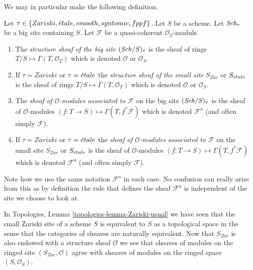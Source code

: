 \noindent
We may in particular make the following definition.

\begin{definition}
\label{definition-structure-sheaf}
Let $\tau \in \{Zariski, \linebreak[0] \etale, \linebreak[0]
smooth, \linebreak[0] syntomic, \linebreak[0] fppf\}$.
Let $S$ be a scheme.
Let $\mathit{Sch}_\tau$ be a big site containing $S$.
Let $\mathcal{F}$ be a quasi-coherent $\mathcal{O}_S$-module.
\begin{enumerate}
\item The {\it structure sheaf of the big site $(\mathit{Sch}/S)_\tau$}
is the sheaf of rings $T/S \mapsto \Gamma(T, \mathcal{O}_T)$ which is
denoted $\mathcal{O}$ or $\mathcal{O}_S$.
\item If $\tau = Zariski$ or $\tau = {\acute{e}tale}$ the
{\it structure sheaf of the small site} $S_{Zar}$ or $S_{\acute{e}tale}$
is the sheaf of rings $T/S \mapsto \Gamma(T, \mathcal{O}_T)$
which is denoted $\mathcal{O}$ or $\mathcal{O}_S$.
\item The {\it sheaf of $\mathcal{O}$-modules associated to
$\mathcal{F}$} on the big site $(\mathit{Sch}/S)_\tau$
is the sheaf of $\mathcal{O}$-modules
$(f : T \to S) \mapsto \Gamma(T, f^*\mathcal{F})$
which is denoted $\mathcal{F}^a$ (and often simply $\mathcal{F}$).
\item If $\tau = Zariski$ or $\tau = {\acute{e}tale}$ the
{\it sheaf of $\mathcal{O}$-modules associated to $\mathcal{F}$}
on the small site $S_{Zar}$ or $S_{\acute{e}tale}$ is the sheaf of
$\mathcal{O}$-modules $(f : T \to S) \mapsto \Gamma(T, f^*\mathcal{F})$
which is denoted $\mathcal{F}^a$ (and often simply $\mathcal{F}$).
\end{enumerate}
\end{definition}

\noindent
Note how we use the same notation $\mathcal{F}^a$ in each case.
No confusion can really arise from this as by definition the rule
that defines the sheaf $\mathcal{F}^a$ is independent of the site
we choose to look at.

\begin{remark}
\label{remark-Zariski-site-space}
In Topologies, Lemma \ref{topologies-lemma-Zariski-usual}
we have seen that the small Zariski site of a scheme $S$ is
equivalent to $S$ as a topological space in the sense that the
categories of sheaves are naturally equivalent. Now that $S_{Zar}$
is also endowed with a structure sheaf $\mathcal{O}$ we see
that sheaves of modules on the ringed site $(S_{Zar}, \mathcal{O})$
agree with sheaves of modules on the ringed space $(S, \mathcal{O}_S)$.
\end{remark}

